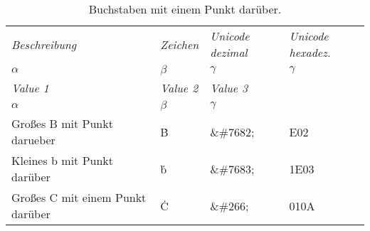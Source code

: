 \documentclass[paper=a5,captions=tableabove]{scrartcl}
\begin{document}
	
	\begin{longtable}{llll}                                  
			\caption{Buchstaben mit einem Punkt darüber.}\label{tab:table1}\\\toprule  %
			\emph{Beschreibung} & {\emph{Zeichen}} & \emph{Unicode dezimal} & {\emph{Unicode hexadez.}}\\
			$\alpha$ & $\beta$ & {$\gamma$} & {$\gamma$} \\\midrule
			\endfirsthead                                           %
			\toprule
			\emph{Value 1} & {\emph{Value 2}} & \emph{Value 3}\\
			$\alpha$ & $\beta$ & {$\gamma$} \\\midrule
			\endhead                                                %
			\midrule                                                
			\endfoot                                                %
			\bottomrule
			\endlastfoot                                            %
			Großes B mit Punkt darueber & Ḃ & \&\#7682; & E02\\
			Kleines b mit Punkt darüber & ḃ & \&\#7683; & 1E03\\
			Großes C mit einem Punkt darüber & Ċ & \&\#266; & 010A\\
			

\end{longtable}
\end{document}

